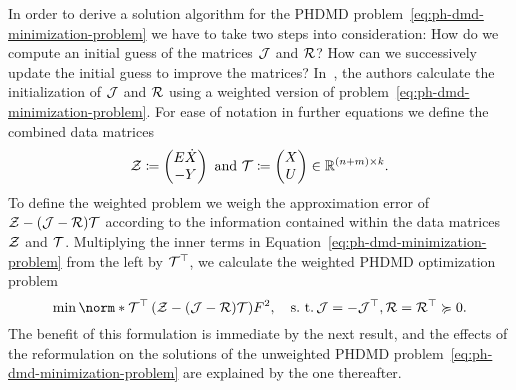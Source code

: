 In order to derive a solution algorithm for the \ac{PHDMD} problem~\eqref{eq:ph-dmd-minimization-problem} we have to take two steps into consideration:
How do we compute an initial guess of the matrices $\mathcal{J}$ and $\mathcal{R}$?
How can we successively update the initial guess to improve the matrices?
In~\cite{Morandin2023}, the authors calculate the initialization of $\mathcal{J}$ and $\mathcal{R}$ using a weighted version of problem~\eqref{eq:ph-dmd-minimization-problem}.
For ease of notation in further equations we define the combined data matrices
\begin{equation}\label{eq:ph-dmd-data-matrices}
    \mathcal{Z} \coloneqq \begin{pmatrix}
        E \dot{X} \\
        -Y
    \end{pmatrix} \text{ and } \mathcal{T} \coloneqq \begin{pmatrix}
        X \\
        U
    \end{pmatrix} \in \mathbb{R}^{(n + m) \times k}.
\end{equation}
To define the weighted problem we weigh the approximation error of $\mathcal{Z} - (\mathcal{J} - \mathcal{R}) \mathcal{T}$ according to the information contained within the data matrices $\mathcal{Z}$ and $\mathcal{T}$.
Multiplying the inner terms in Equation~\eqref{eq:ph-dmd-minimization-problem} from the left by $\mathcal{T}^{\top}$, we calculate the weighted \ac{PHDMD} optimization problem
\begin{equation}\label{eq:weighted-ph-dmd}
    \min \norm*{\mcl{T}\trans \left( \mcl{Z} - (\mcl{J} - \mcl{R}) \mcl{T} \right)}{F}^2,\quad \suchthat \mcl{J} = - \mcl{J}\trans, \mcl{R} = \mcl{R}\trans \succcurlyeq 0.
\end{equation}
The benefit of this formulation is immediate by the next result, and the effects of the reformulation on the solutions of the unweighted \ac{PHDMD} problem~\eqref{eq:ph-dmd-minimization-problem} are explained by the one thereafter.

